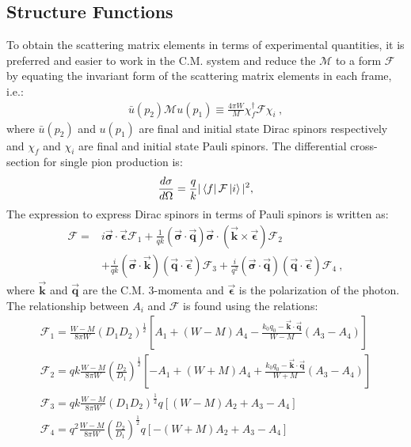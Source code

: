 \subsection{Structure Functions}\label{sec:CGLN}
To obtain the scattering matrix elements in terms of experimental quantities, it is preferred and easier to work in the C.M. system and reduce the $\mathcal{M}$ to a form $\mathcal{F}$ by equating the invariant form of the scattering matrix elements in each frame, i.e.:
\begin{align}
\bar{u}(p_2)\mathcal{M} u(p_1) \equiv \frac{4 \pi W}{M}\chi_f^\dagger \mathcal{F} \chi_i \ ,
\end{align}
where $\bar{u}(p_2)$ and $u(p_1)$ are final and initial state Dirac spinors respectively and $\chi_f$ and $\chi_i$ are final and initial state Pauli spinors. The differential cross-section for single pion production is:
\begin{align}
\frac{d\sigma}{d\Omega} = \frac{q}{k}| \left<f\right|\mathcal F \left|i\right>|^2,
\end{align}
The expression to express Dirac spinors in terms of Pauli spinors is written as:
\begin{align}
\mathcal{F} = & i\vec{\mathbf{\sigma}}\cdot \vec{\mathbf{\epsilon}} \mathcal{F}_1 + \frac{1}{qk}(\vec{\mathbf{\sigma}}\cdot \vec{\mathbf{q}})\vec{\mathbf{\sigma}} \cdot(\vec{\mathbf{k}}\times \vec{\mathbf{\epsilon}}) \mathcal{F}_2 \nonumber \\ & + \frac{i}{qk}(\vec{\mathbf{\sigma}}\cdot \vec{\mathbf{k}})(\vec{\mathbf{q}}\cdot \vec{\mathbf{\epsilon}})\mathcal{F}_3 + \frac{i}{q^2}(\vec{\mathbf{\sigma}}\cdot \vec{\mathbf{q}})(\vec{\mathbf{q}}\cdot \vec{\mathbf{\epsilon}})\mathcal{F}_4 \ ,
\end{align}
where $\vec{\mathbf{k}}$ and $\vec{\mathbf{q}}$ are the C.M. 3-momenta and $\vec{\mathbf{\epsilon}}$ is the polarization of the photon. The relationship between $A_i$ and $\mathcal{F}$ is found using the relations:
\begin{align}
\mathcal{F}_1 = \frac{W- M}{8 \pi W }(D_1 D_2)^{\frac{1}{2}}\left[ A_1+(W-M)A_4 - \frac{k_0q_0-\vec{\mathbf{k}}\cdot \vec{\mathbf{q}}}{W-M}(A_3-A_4)\right] \\
\mathcal{F}_2 = qk \frac{W- M}{8 \pi W }(\frac{D_2}{D_1})^{\frac{1}{2}}\left[ -A_1+(W+M)A_4 + \frac{k_0q_0-\vec{\mathbf{k}}\cdot \vec{\mathbf{q}}}{W+M}(A_3-A_4)\right]  \\
\mathcal{F}_3 =qk \frac{W- M}{8 \pi W }(D_1 D_2)^{\frac{1}{2}}q\left[(W-M)A_2 + A_3 - A_4\right]\\
\mathcal{F}_4 = q^2 \frac{W- M}{8 \pi W }(\frac{D_2}{D_1})^{\frac{1}{2}}q\left[ -(W+M)A_2 + A_3 - A_4\right] 
\end{align}
